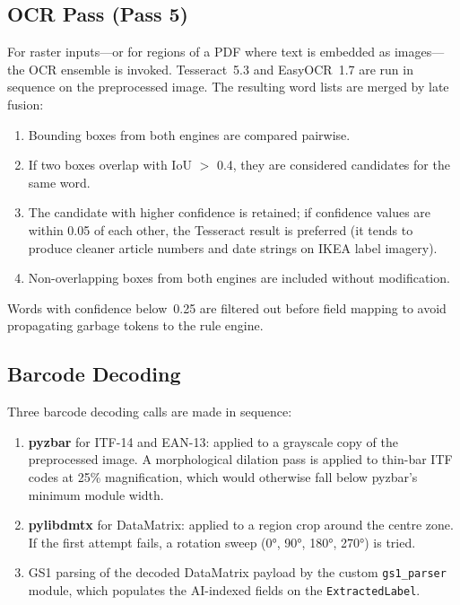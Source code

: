 \subsection{OCR Pass (Pass 5)}

For raster inputs—or for regions of a PDF where text is embedded as images—the \ac{OCR}
ensemble is invoked. Tesseract~5.3 and EasyOCR~1.7 are run in sequence on the
preprocessed image. The resulting word lists are merged by late fusion:

\begin{enumerate}
  \item Bounding boxes from both engines are compared pairwise.
  \item If two boxes overlap with IoU $>$ 0.4, they are considered candidates for the same
  word.
  \item The candidate with higher confidence is retained; if confidence values are within
  0.05 of each other, the Tesseract result is preferred (it tends to produce cleaner
  article numbers and date strings on IKEA label imagery).
  \item Non-overlapping boxes from both engines are included without modification.
\end{enumerate}

Words with confidence below~0.25 are filtered out before field mapping to avoid
propagating garbage tokens to the rule engine.

\subsection{Barcode Decoding}

Three barcode decoding calls are made in sequence:

\begin{enumerate}
  \item \textbf{pyzbar} for ITF-14 and EAN-13: applied to a grayscale copy of the
  preprocessed image. A morphological dilation pass is applied to thin-bar ITF codes
  at 25\% magnification, which would otherwise fall below pyzbar's minimum module width.
  \item \textbf{pylibdmtx} for DataMatrix: applied to a region crop around the centre
  zone. If the first attempt fails, a rotation sweep (0°, 90°, 180°, 270°) is tried.
  \item GS1 parsing of the decoded DataMatrix payload by the custom \texttt{gs1\_parser}
  module, which populates the AI-indexed fields on the \texttt{ExtractedLabel}.
\end{enumerate}

